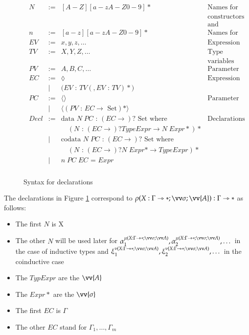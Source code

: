 \documentclass[a4paper,cleardoubleempty,BCOR1cm]{scrbook}
\begin{document}
\begin{figure}
 \begin{align*}
   \begin{array}{llll}
    N &:= &[A-Z][a-zA-Z0-9]* &\text{Names for types,}\\
         & &&          \text{constructors}\\
         & &&          \text{and destructors}\\
    n &:= &[a-z][a-zA-Z0-9]* &\text{Names for expressions}\\
    EV &:= &x,y,z,\dots &\text{Expression variables} \\
    TV &:= &X,Y,Z,\dots &\text{Type expression} \\
         & &&          \text{variables}\\
    PV  &:= &A,B,C,\dots &\text{Parameter variables} \\
    EC &:= &\lozenge &\text{Expression Context} \\
           &| &\text{(} EV \text { : } TV (,EV \text{ : } TV)*\text{)}& \\
    PC &:= &\langle\rangle &\text{Parameter Context} \\
       &| &\langle(PV \text{ : } EC \rightarrow \text{ Set})*\rangle & \\
    Decl &:= &\text{data } N\; PC \text{ : } (EC \rightarrow)? \text{ Set where} &\text{Declarations}\\
              &&\quad(N \text{ : }  (EC \rightarrow)? TypeExpr \rightarrow N\; Expr*)* &\\
         &| &\text{codata } N\; PC \text{ : } (EC \rightarrow)? \text{ Set where}& \\
     &&\quad(N \text{ : }  (EC \rightarrow)? N\; Expr* \rightarrow TypeExpr)*& \\
    &| &n \; PC \; EC \text{ = } Expr & \\
  \end{array}
\end{align*}
\caption{Syntax for declarations}
\label{syntax-for-declarations}
\end{figure}

The declarations in Figure \ref{syntax-for-declarations} correspond to \(\rho(X:\Gamma\rat*;\vv\sigma;\vv{A}):\Gamma\rat*\) as follows:
\begin{itemize}
\item The first \(N\) is X
\item The other \(N\) will be used later for
\(\alpha_1^{\mu(X:\Gamma\rat *;\vv\sigma;\vv A)},\alpha_2^{\mu(X:\Gamma\rat *;\vv\sigma;\vv A)},\dots\)
in the case of inductive types and
\(\xi_1^{\nu(X:\Gamma\rat *;\vv\sigma;\vv A)},\xi_2^{\nu(X:\Gamma\rat *;\vv\sigma;\vv A)},\dots\)
in the coinductive case
\item The \(TypExpr\) are the \(\vv{A}\)
\item The \(Expr*\) are the \(\vv{\sigma}\)
\item The first \(EC\) is \(\Gamma\)
\item The other \(EC\) stand for \(\Gamma_1,\dots,\Gamma_m\)
\end{itemize}
\end{document}
